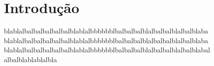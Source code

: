 
\chapter*[Introdução]{Introdução}

blablalbalbalbalbalbalblablalbbbbbblbalbalbalblalbalbalblalbalblaba
blablalbalbalbalbalbalblablalbbbbbblbalbalbalblalbalbalblalbalblaba
blablalbalbalbalbalbalblablalbbbbbblbalbalbalblalbalbalblalbalblabal
albalblablablalbla
